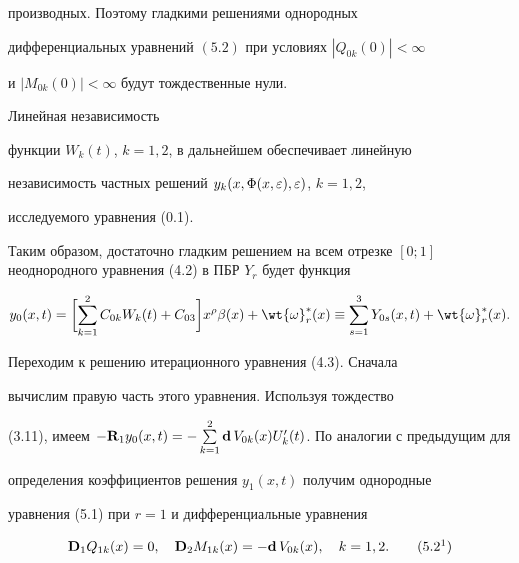 производных. Поэтому гладкими решениями однородных


дифференциальных уравнений $(5.2)$ при условиях $| Q_{0k} (0)| <\infty$


и $|M_{0k} (0)| < \infty$ будут тождественные нули.





Линейная независимость


функции $W_k (t)$, $k=1, 2$, в дальнейшем обеспечивает линейную


независимость частных решений $y_k (x, \Phi(x,\varepsilon), \varepsilon)$, $k=1,2$,


исследуемого уравнения (0.1).





Таким образом, достаточно гладким решением на всем отрезке $[0;


1]$ неоднородного уравнения (4.2) в ПБР $Y_r$ будет функция


\begin{equation}


y_0 (x, t) = \biggl[ \sum \limits_{k=1}^2 C_{0k} W_k (t) + C_{03}


\biggr] x^\rho \beta(x) + \wt{\o}_r^* (x) \equiv \sum


\limits_{s=1}^3 Y_{0s} (x, t) + \wt{\o}_r^* (x).


\end{equation}





Переходим к решению итерационного уравнения (4.3). Сначала


вычислим правую часть этого уравнения. Используя тождество


(3.11), имеем $- \bold{R}_1 y_0 (x, t) = - \sum \limits_{k=1}^2


\bold{d} \,V_{0k} (x) U'_k (t)$. По аналогии с предыдущим для


определения коэффициентов решения $y_1 (x, t)$ получим однородные


уравнения (5.1) при $r=1$ и дифференциальные уравнения


\begin{equation}


\bold{D}_1 Q_{1k} (x) =0, \quad \bold{D}_2 M_{1k} (x) = -


\bold{d} \, V_{0k} (x),\quad k=1,2. \tag{$5.2^1$}


\end{equation}


